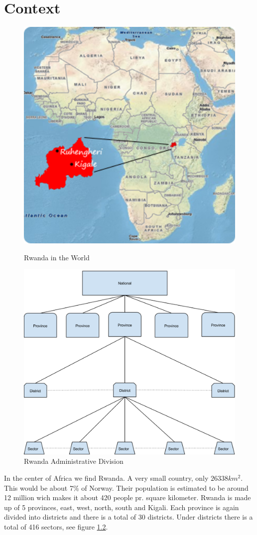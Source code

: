 \chapter{Context}
\begin{figure}
\centering
\includegraphics[width=12cm]{empirical/images/context_map_rwanda}
\label{context_map_of_rwanda}
\caption{Rwanda in the World \cite{14}}
\end{figure}
\begin{figure}
\centering
\includegraphics[width=12cm]{empirical/images/rwanda_administrative_division}
\caption{Rwanda Administrative Division}
\label{rwanda_administrative_division}
\end{figure}
In the center of Africa we find Rwanda. A very small country, only \(26338 km^2\). This would be about 7\% of Norway. 
Their population is estimated to be around 12 million wich makes it about 420 people pr. square kilometer. 
Rwanda is made up of 5 provinces, east, west, north, south and Kigali. 
Each province is again divided into districts and there is a total of 30 districts. Under districts there is a total of 416 sectors\cite{1}, see figure \ref{rwanda_administrative_division}.

